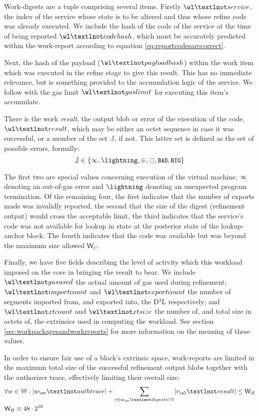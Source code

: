 Work-digests are a tuple comprising several items. Firstly $\wl¬service$, the index of the service whose state is to be altered and thus whose refine code was already executed. We include the hash of the code of the service at the time of being reported $\wl¬codehash$, which must be accurately predicted within the work-report according to equation \ref{eq:reportcodesarecorrect}.

Next, the hash of the payload ($\wl¬payloadhash$) within the work item which was executed in the refine stage to give this result. This has no immediate relevance, but is something provided to the accumulation logic of the service. We follow with the gas limit $\wl¬gaslimit$ for executing this item's accumulate.

There is the work \emph{result}, the output blob or error of the execution of the code, $\wl¬result$, which may be either an octet sequence in case it was successful, or a member of the set $\mathbb{J}$, if not. This latter set is defined as the set of possible errors, formally:
\begin{equation}
  \mathbb{J} \in \{ \oog, \panic, \badexports, \oversize, \token{BAD}, \token{BIG} \}
\end{equation}

The first two are special values concerning execution of the virtual machine, $\infty$ denoting an out-of-gas error and $\panic$ denoting an unexpected program termination. Of the remaining four, the first indicates that the number of exports made was invalidly reported, the second that the size of the digest (refinement output) would cross the acceptable limit, the third indicates that the service's code was not available for lookup in state at the posterior state of the lookup-anchor block. The fourth indicates that the code was available but was beyond the maximum size allowed $\mathsf{W}_C$.

Finally, we have five fields describing the level of activity which this workload imposed on the core in bringing the result to bear. We include $\wl¬gasused$ the actual amount of gas used during refinement; $\wl¬importcount$ and $\wl¬exportcount$ the number of segments imported from, and exported into, the D$^3$L respectively; and $\wl¬xtcount$ and $\wl¬xtsize$ the number of, and total size in octets of, the extrinsics used in computing the workload. See section \ref{sec:workpackagesandworkreports} for more information on the meaning of these values.

In order to ensure fair use of a block's extrinsic space, work-reports are limited in the maximum total size of the successful refinement output blobs together with the authorizer trace, effectively limiting their overall size:
\begin{align}
  &\forall w \in \workreport:
    \len{w_\wr¬authtrace} + \sum_{r \in w_\wr¬digests \cap \blob} \len{r_\wl¬result} \le \mathsf{W}_R \\
  &\mathsf{W}_R \equiv 48\cdot2^{10}
\end{align}









